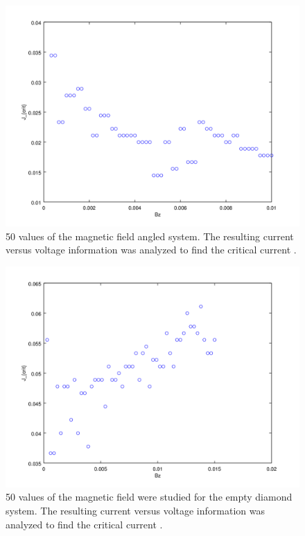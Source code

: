 \begin{figure}[htbp]
\begin{center}
\includegraphics[scale=.50]{angleBz.png}
\caption{ 50 values of the magnetic field angled system. The resulting current versus voltage information was analyzed to find the critical current .  }
\label{angleBz}
\end{center}
\end{figure}


\begin{figure}[htbp]
\begin{center}
\includegraphics[scale=.50]{emptyBz.png}
\caption{ 50 values of the magnetic field were studied for the empty diamond system. The resulting current versus voltage information was analyzed to find the critical current .  }
\label{emptyBz}
\end{center}
\end{figure}

